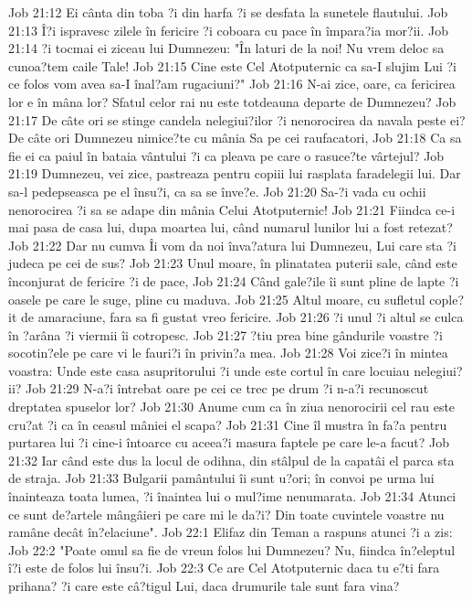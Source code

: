 Job 21:12  Ei cânta din toba ?i din harfa ?i se desfata la sunetele flautului.
Job 21:13  Î?i ispravesc zilele în fericire ?i coboara cu pace în împara?ia mor?ii.
Job 21:14  ?i tocmai ei ziceau lui Dumnezeu: "În laturi de la noi! Nu vrem deloc sa cunoa?tem caile Tale!
Job 21:15  Cine este Cel Atotputernic ca sa-I slujim Lui ?i ce folos vom avea sa-I înal?am rugaciuni?"
Job 21:16  N-ai zice, oare, ca fericirea lor e în mâna lor? Sfatul celor rai nu este totdeauna departe de Dumnezeu?
Job 21:17  De câte ori se stinge candela nelegiui?ilor ?i nenorocirea da navala peste ei? De câte ori Dumnezeu nimice?te cu mânia Sa pe cei raufacatori,
Job 21:18  Ca sa fie ei ca paiul în bataia vântului ?i ca pleava pe care o rasuce?te vârtejul?
Job 21:19  Dumnezeu, vei zice, pastreaza pentru copiii lui rasplata faradelegii lui. Dar sa-l pedepseasca pe el însu?i, ca sa se înve?e.
Job 21:20  Sa-?i vada cu ochii nenorocirea ?i sa se adape din mânia Celui Atotputernic!
Job 21:21  Fiindca ce-i mai pasa de casa lui, dupa moartea lui, când numarul lunilor lui a fost retezat?
Job 21:22  Dar nu cumva Îi vom da noi înva?atura lui Dumnezeu, Lui care sta ?i judeca pe cei de sus?
Job 21:23  Unul moare, în plinatatea puterii sale, când este înconjurat de fericire ?i de pace,
Job 21:24  Când gale?ile îi sunt pline de lapte ?i oasele pe care le suge, pline cu maduva.
Job 21:25  Altul moare, cu sufletul cople?it de amaraciune, fara sa fi gustat vreo fericire.
Job 21:26  ?i unul ?i altul se culca în ?arâna ?i viermii îi cotropesc.
Job 21:27  ?tiu prea bine gândurile voastre ?i socotin?ele pe care vi le fauri?i în privin?a mea.
Job 21:28  Voi zice?i în mintea voastra: Unde este casa asupritorului ?i unde este cortul în care locuiau nelegiui?ii?
Job 21:29  N-a?i întrebat oare pe cei ce trec pe drum ?i n-a?i recunoscut dreptatea spuselor lor?
Job 21:30  Anume cum ca în ziua nenorocirii cel rau este cru?at ?i ca în ceasul mâniei el scapa?
Job 21:31  Cine îl mustra în fa?a pentru purtarea lui ?i cine-i întoarce cu aceea?i masura faptele pe care le-a facut?
Job 21:32  Iar când este dus la locul de odihna, din stâlpul de la capatâi el parca sta de straja.
Job 21:33  Bulgarii pamântului îi sunt u?ori; în convoi pe urma lui înainteaza toata lumea, ?i înaintea lui o mul?ime nenumarata.
Job 21:34  Atunci ce sunt de?artele mângâieri pe care mi le da?i? Din toate cuvintele voastre nu ramâne decât în?elaciune".
Job 22:1  Elifaz din Teman a raspuns atunci ?i a zis:
Job 22:2  "Poate omul sa fie de vreun folos lui Dumnezeu? Nu, fiindca în?eleptul î?i este de folos lui însu?i.
Job 22:3  Ce are Cel Atotputernic daca tu e?ti fara prihana? ?i care este câ?tigul Lui, daca drumurile tale sunt fara vina?
